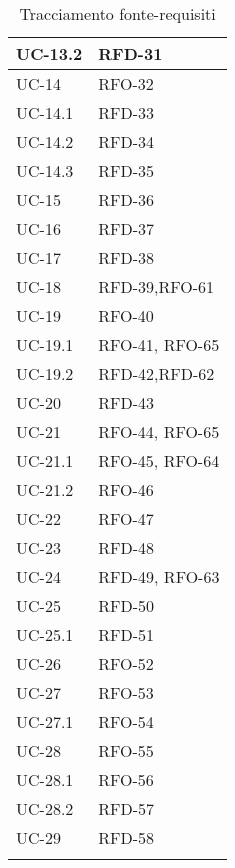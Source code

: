 \begin{xltabular}{\textwidth}{|X| X |}
    UC-13.2 & RFD-31\\
    \hline
    UC-14 & RFO-32 \\
    \hline
    UC-14.1 & RFD-33  \\
    \hline
    UC-14.2 & RFD-34\\
    \hline
    UC-14.3 & RFD-35\\
    \hline
    UC-15 & RFD-36 \\
    \hline
    UC-16 & RFD-37\\
    \hline
    UC-17 & RFD-38 \\
    \hline
    UC-18 & RFD-39,\newline RFO-61  \\
    \hline
    UC-19 & RFO-40 \\
    \hline
    UC-19.1 & RFO-41, \newline RFO-65 \\
    \hline
    UC-19.2 & RFD-42,\newline RFD-62 \\
    \hline
    UC-20 & RFD-43 \\
    \hline
    UC-21 & RFO-44, \newline RFO-65 \\
    \hline
    UC-21.1 & RFO-45, \newline RFO-64 \\
    \hline
    UC-21.2 & RFO-46 \\
    \hline
    UC-22 & RFO-47  \\
    \hline
    UC-23 & RFD-48 \\
    \hline
    UC-24 & RFD-49, \newline RFO-63 \\
    \hline
    UC-25 & RFD-50  \\
    \hline
    UC-25.1 & RFD-51  \\
    \hline
    UC-26 & RFO-52 \\
    \hline
    UC-27 & RFO-53  \\
    \hline
    UC-27.1 & RFO-54 \\
    \hline
    UC-28 & RFO-55  \\
    \hline
    UC-28.1 & RFO-56 \\
    \hline
    UC-28.2 & RFD-57 \\
    \hline
    UC-29 & RFD-58 \\
   \hline
     \caption{Tracciamento fonte-requisiti}
    \label{tab:riepilogo}
\end{xltabular}

